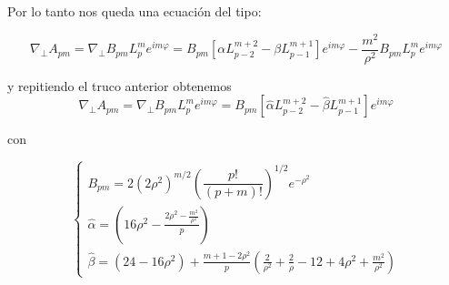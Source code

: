 \documentclass[a4paper,11pt,spanish,sans]{exam}
\begin{document}
Por lo tanto nos queda una ecuación del tipo:

\[ \nabla_{\bot}A_{pm}=\nabla_{\bot}B_{pm}L_p^m e^{im\varphi}=B_{pm}[\alpha L_{p-2}^{m+2} - \beta L_{p-1}^{m+1} ] e^{im\varphi} -\frac{m^2}{\rho^2}B_{pm}L^m_p e^{im\varphi}
\]

y repitiendo el truco anterior obtenemos 
\[ \nabla_{\bot}A_{pm}=\nabla_{\bot}B_{pm}L_p^m e^{im\varphi}=B_{pm}[\hat{\alpha} L_{p-2}^{m+2} - \hat{\beta}L_{p-1}^{m+1} ] e^{im\varphi}
\]

con

\[\begin{cases}
B_{pm}=2(2\rho^2)^{m/2}(\dfrac{p!}{(p+m)!})^{1/2}e^{-\rho{^2}} \\
\hat{\alpha}=(16\rho^2-\frac{2\rho^2-\frac{m^2}{\rho^2}}{p})\\
\hat{\beta}= (24-16\rho^2)+\frac{m+1-2\rho^2}{p}(\frac{2}{\rho^2}+\frac{2}{\rho}-12+4\rho^2+\frac{m^2}{\rho^2})
\end{cases}

\]
\end{document}
